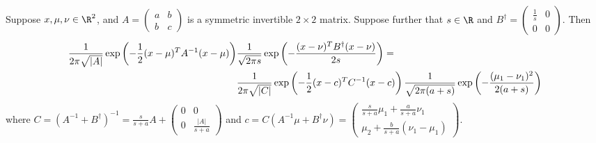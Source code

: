 \documentclass{article}
\begin{document}
\begin{fact} \label{sum_of_normal}
Suppose $x,\mu,\nu\in\R^2$, and $A=\left(\begin{array}{cc} a & b \\ b & c \end{array}\right)$ is a symmetric invertible $2\times 2$ matrix. Suppose further that $s\in\R$ and $B^\dagger = \left(\begin{array}{cc} \frac{1}{s} & 0 \\ 0 & 0 \end{array}\right)$. Then 
\begin{align}
\frac{1}{2\pi\sqrt{|A|}}\exp\left(-\frac{1}{2}(x-\mu)^TA^{-1}(x-\mu)\right)&\frac{1}{\sqrt{2\pi s}}\exp\left(-\frac{(x-\nu)^TB^\dagger(x-\nu)}{2s}\right)= \notag
\\&\frac{1}{2\pi\sqrt{|C|}}\exp\left(-\frac{1}{2}(x-c)^TC^{-1}(x-c)\right)\frac{1}{\sqrt{2\pi(a+s)}}\exp\left(-\frac{(\mu_1-\nu_1)^2}{2(a+s)}\right)
\end{align}
where $C=(A^{-1}+B^{\dagger})^{-1}=\frac{s}{s+a}A+\left(\begin{array}{cc} 0 & 0 \\ 0 & \frac{|A|}{s+a}\end{array}\right)$ and $c=C(A^{-1}\mu+B^\dagger\nu)=\left(\begin{array}{c}\frac{s}{s+a}\mu_1+\frac{a}{s+a}\nu_1 \\ \mu_2+\frac{b}{s+a}(\nu_1-\mu_1) \end{array}\right)$.
\end{fact}
\end{document}
